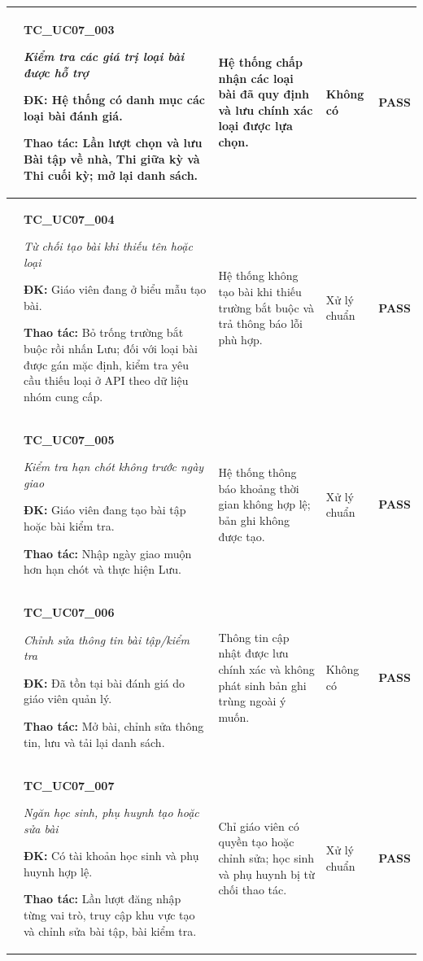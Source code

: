 \begin{longtable}{|>{\centering\arraybackslash}p{0.8cm}|>{\raggedright\arraybackslash}p{4.6cm}|>{\raggedright\arraybackslash}p{3.8cm}|>{\raggedright\arraybackslash}p{3.8cm}|>{\centering\arraybackslash}p{1.5cm}|}
3 & \textbf{TC\_UC07\_003}\par \textit{Kiểm tra các giá trị loại bài được hỗ trợ}\par \textbf{ĐK:} Hệ thống có danh mục các loại bài đánh giá.\par \textbf{Thao tác:} Lần lượt chọn và lưu Bài tập về nhà, Thi giữa kỳ và Thi cuối kỳ; mở lại danh sách. & Hệ thống chấp nhận các loại bài đã quy định và lưu chính xác loại được lựa chọn. & Không có & \textbf{PASS} \\ \hline
4 & \textbf{TC\_UC07\_004}\par \textit{Từ chối tạo bài khi thiếu tên hoặc loại}\par \textbf{ĐK:} Giáo viên đang ở biểu mẫu tạo bài.\par \textbf{Thao tác:} Bỏ trống trường bắt buộc rồi nhấn Lưu; đối với loại bài được gán mặc định, kiểm tra yêu cầu thiếu loại ở API theo dữ liệu nhóm cung cấp. & Hệ thống không tạo bài khi thiếu trường bắt buộc và trả thông báo lỗi phù hợp. & Xử lý chuẩn & \textbf{PASS} \\ \hline
5 & \textbf{TC\_UC07\_005}\par \textit{Kiểm tra hạn chót không trước ngày giao}\par \textbf{ĐK:} Giáo viên đang tạo bài tập hoặc bài kiểm tra.\par \textbf{Thao tác:} Nhập ngày giao muộn hơn hạn chót và thực hiện Lưu. & Hệ thống thông báo khoảng thời gian không hợp lệ; bản ghi không được tạo. & Xử lý chuẩn & \textbf{PASS} \\ \hline
6 & \textbf{TC\_UC07\_006}\par \textit{Chỉnh sửa thông tin bài tập/kiểm tra}\par \textbf{ĐK:} Đã tồn tại bài đánh giá do giáo viên quản lý.\par \textbf{Thao tác:} Mở bài, chỉnh sửa thông tin, lưu và tải lại danh sách. & Thông tin cập nhật được lưu chính xác và không phát sinh bản ghi trùng ngoài ý muốn. & Không có & \textbf{PASS} \\ \hline
7 & \textbf{TC\_UC07\_007}\par \textit{Ngăn học sinh, phụ huynh tạo hoặc sửa bài}\par \textbf{ĐK:} Có tài khoản học sinh và phụ huynh hợp lệ.\par \textbf{Thao tác:} Lần lượt đăng nhập từng vai trò, truy cập khu vực tạo và chỉnh sửa bài tập, bài kiểm tra. & Chỉ giáo viên có quyền tạo hoặc chỉnh sửa; học sinh và phụ huynh bị từ chối thao tác. & Xử lý chuẩn & \textbf{PASS} \\ \hline
\end{longtable}



